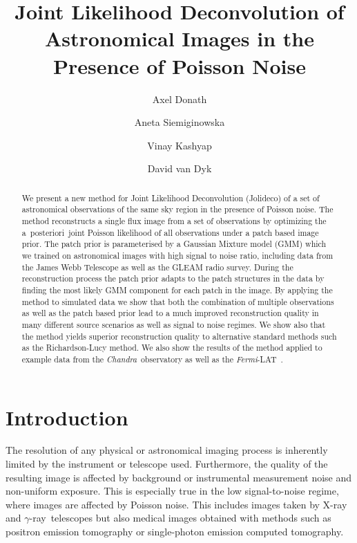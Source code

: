 \documentclass[twocolumn]{aastex631}
\newcommand{\chandra}{\textit{Chandra}~}
\newcommand{\fermi}{\textit{Fermi}-LAT~}
\newcommand{\aposteriori}{a~posteriori~}
\newcommand{\gammaray}{$\gamma$-ray\xspace}
\newcommand{\xray}{X-ray\xspace}
\begin{document}
    \title{Joint Likelihood Deconvolution of Astronomical Images in the Presence of Poisson Noise}

    \author[0000-0003-4568-7005]{Axel Donath}
    \author[0000-0002-0905-7375]{Aneta Siemiginowska}
    \author[0000-0002-3869-7996]{Vinay Kashyap} 
    \author[0000-0000-0000-0000]{David van Dyk}
    


    \begin{abstract}
        We present a new method for Joint Likelihood Deconvolution (Jolideco) of a set of astronomical observations of the same sky region in the presence of Poisson noise. The method reconstructs a single flux image from a set of observations by optimizing the \aposteriori joint Poisson likelihood of all observations under a patch based image prior. The patch prior is parameterised by a Gaussian Mixture model (GMM) which we trained on astronomical images with high signal to noise ratio, including data from the  James Webb Telescope as well as the GLEAM radio survey. During the reconstruction process the patch prior adapts to the patch structures in the data by finding the most likely GMM component for each patch in the image. By applying the method to simulated data we show that both the combination of multiple observations as well as the patch based prior lead to a much improved reconstruction quality in many different source scenarios as well as signal to noise regimes. We show also that the method yields superior reconstruction quality to alternative standard methods such as the Richardson-Lucy method. We also show the results of the method applied to example data from the \chandra observatory as well as the \fermi. 
    \end{abstract}



    \section{Introduction}
    The resolution of any physical or astronomical imaging process is inherently limited by the instrument or telescope used. Furthermore, the quality of the resulting image is affected by background or instrumental measurement noise and non-uniform exposure. This is especially true in the low signal-to-noise regime, where images are affected by Poisson noise. This includes images taken by \xray and \gammaray~telescopes but also medical images obtained with methods such as positron emission tomography or single-photon emission computed tomography.
\end{document}
